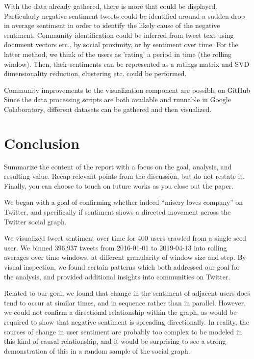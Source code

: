 \documentclass[11pt]{article}
\begin{document}
With the data already gathered, there is more that could be displayed. Particularly negative sentiment tweets could be identified around a sudden drop in average sentiment in order to identify the likely cause of the negative sentiment. Community identification could be inferred from tweet text using document vectors etc., by social proximity, or by sentiment over time. For the latter method, we think of the users as 'rating' a period in time (the rolling window). Then, their sentiments can be represented as a ratings matrix and SVD dimensionality reduction, clustering etc. could be performed.\newline

Community improvements to the visualization component are possible on GitHub Since the data processing scripts are both available and runnable in Google Colaboratory, different datasets can be gathered and then visualized.


\section{Conclusion}
Summarize the content of the report with a focus on the goal, analysis, and resulting value. Recap relevant points from the discussion, but do not restate it. Finally, you can choose to touch on future works as you close out the paper.\newline

We began with a goal of confirming whether indeed “misery loves company” on Twitter, and specifically if sentiment shows a directed movement across the Twitter social graph.\newline

We visualized tweet sentiment over time for 400 users crawled from a single seed user. We binned 396,937 tweets from 2016-01-01 to 2019-04-13 into rolling averages over time windows, at different granularity of window size and step. By visual inspection, we found certain patterns which both addressed our goal for the analysis, and provided additional insights into communities on Twitter.\newline

Related to our goal, we found that change in the sentiment of adjacent users does tend to occur at similar times, and in sequence rather than in parallel. However, we could not confirm a directional relationship within the graph, as would be required to show that negative sentiment is spreading directionally. In reality, the sources of change in user sentiment are probably too complex to be modeled in this kind of causal relationship, and it would be surprising to see a strong demonstration of this in a random sample of the social graph.\newline
\end{document}

